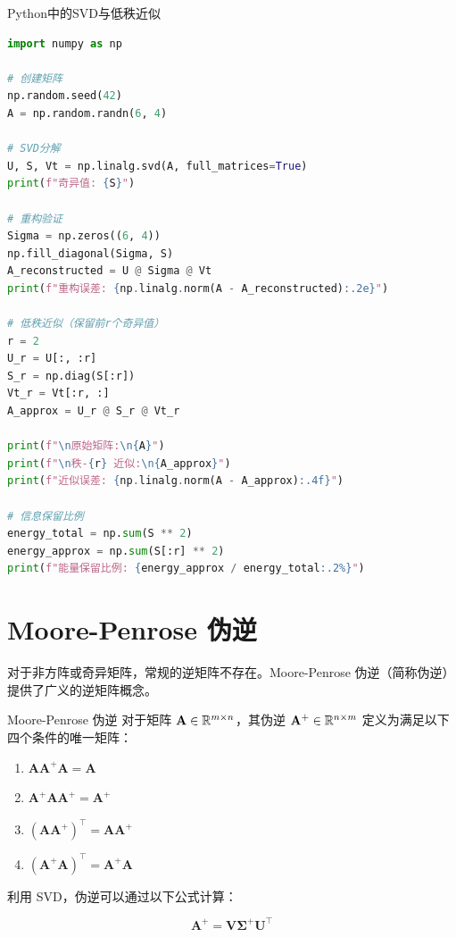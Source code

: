 \begin{mycode}{Python中的SVD与低秩近似}
\begin{lstlisting}[language=Python]
import numpy as np

# 创建矩阵
np.random.seed(42)
A = np.random.randn(6, 4)

# SVD分解
U, S, Vt = np.linalg.svd(A, full_matrices=True)
print(f"奇异值: {S}")

# 重构验证
Sigma = np.zeros((6, 4))
np.fill_diagonal(Sigma, S)
A_reconstructed = U @ Sigma @ Vt
print(f"重构误差: {np.linalg.norm(A - A_reconstructed):.2e}")

# 低秩近似（保留前r个奇异值）
r = 2
U_r = U[:, :r]
S_r = np.diag(S[:r])
Vt_r = Vt[:r, :]
A_approx = U_r @ S_r @ Vt_r

print(f"\n原始矩阵:\n{A}")
print(f"\n秩-{r} 近似:\n{A_approx}")
print(f"近似误差: {np.linalg.norm(A - A_approx):.4f}")

# 信息保留比例
energy_total = np.sum(S ** 2)
energy_approx = np.sum(S[:r] ** 2)
print(f"能量保留比例: {energy_approx / energy_total:.2%}")
\end{lstlisting}
\end{mycode}

\section{Moore-Penrose 伪逆}

对于非方阵或奇异矩阵，常规的逆矩阵不存在。Moore-Penrose 伪逆（简称伪逆）提供了广义的逆矩阵概念。

\begin{mydefinition}{Moore-Penrose 伪逆}
对于矩阵 $\mathbf{A}\in\mathbb{R}^{m\times n}$，其伪逆 $\mathbf{A}^{+}\in\mathbb{R}^{n\times m}$ 定义为满足以下四个条件的唯一矩阵：
\begin{enumerate}
    \item $\mathbf{A}\mathbf{A}^{+}\mathbf{A}=\mathbf{A}$
    \item $\mathbf{A}^{+}\mathbf{A}\mathbf{A}^{+}=\mathbf{A}^{+}$
    \item $(\mathbf{A}\mathbf{A}^{+})^{\top}=\mathbf{A}\mathbf{A}^{+}$
    \item $(\mathbf{A}^{+}\mathbf{A})^{\top}=\mathbf{A}^{+}\mathbf{A}$
\end{enumerate}
\end{mydefinition}

利用 SVD，伪逆可以通过以下公式计算：

\[
\mathbf{A}^{+} = \mathbf{V}\boldsymbol{\Sigma}^{+}\mathbf{U}^{\top}
\]

